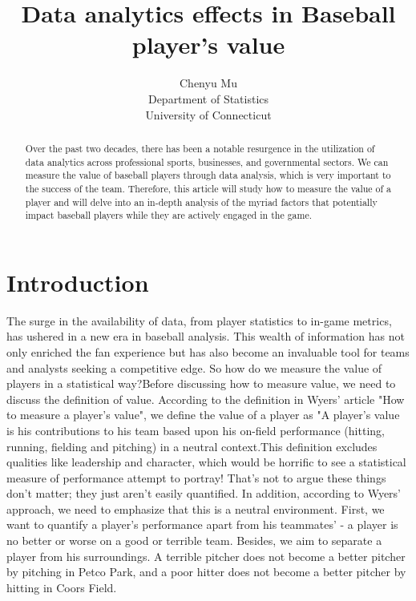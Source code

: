 \documentclass[12pt]{article}
\title{Data analytics effects in Baseball player's value}
\author{Chenyu Mu\\
  Department of Statistics\\
  University of Connecticut
}
\begin{document}
\maketitle

\begin{abstract}
  Over the past two decades, there has been a notable resurgence in the utilization of data analytics across 
  professional sports, businesses, and governmental sectors. We can measure the value of baseball players through
  data analysis, which is very important to the success of the team. Therefore, this article will study how to 
  measure the value of a player and will delve into an in-depth analysis of the myriad factors that potentially 
  impact baseball players while they are actively engaged in the game. 
\end{abstract}


\section{Introduction}
\label{sec:intro}
  
The surge in the availability of data, from player statistics to in-game metrics, has ushered in a new era in 
baseball analysis. This wealth of information has not only enriched the fan experience but has also become an 
invaluable tool for teams and analysts seeking a competitive edge. So how do we measure the value of players in
a statistical way?Before discussing how to measure value, we need to discuss the definition of value. 
According to the definition in Wyers' article "How to measure a player's value"\cite*{web:Wyers:Part1}, we define 
the value of a player as "A player's value is his contributions to his team based upon his on-field performance 
(hitting, running, fielding and pitching) in a neutral context.This definition excludes qualities like leadership 
and character, which would be horrific to see a statistical measure of performance attempt to portray! That's not 
to argue these things don't matter; they just aren't easily quantified. In addition, according to Wyers' approach, 
we need to emphasize that this is a neutral environment. First, we want to quantify a player's performance apart 
from his teammates' - a player is no better or worse on a good or terrible team. Besides, we aim to separate a 
player from his surroundings. A terrible pitcher does not become a better pitcher by pitching in Petco Park, and 
a poor hitter does not become a better pitcher by hitting in Coors Field.\\
\end{document}
